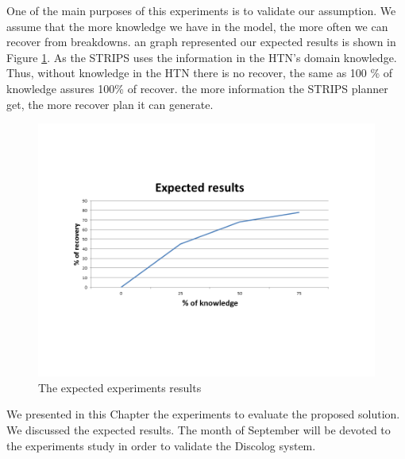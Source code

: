 One of the main purposes of this experiments is to validate our assumption. We assume that the more knowledge we have in the model, the more often we can recover from breakdowns. an graph represented our expected results is shown in Figure \ref{expet}.
As the STRIPS uses the information in the HTN's domain knowledge. Thus, without knowledge in the HTN there is no recover, the same as 100 \% of knowledge assures 100\% of recover. the more information the STRIPS planner get, the more recover plan it can generate.
\begin{figure}[h]
	\centering
	\includegraphics[width=\textwidth]{Pictures/expected.png}
	\caption{\label{expet} The expected experiments results}
\end{figure}

We presented in this Chapter the experiments to evaluate the proposed solution. We discussed the expected results. The month of September will be devoted to the experiments study in order to validate the Discolog system.
